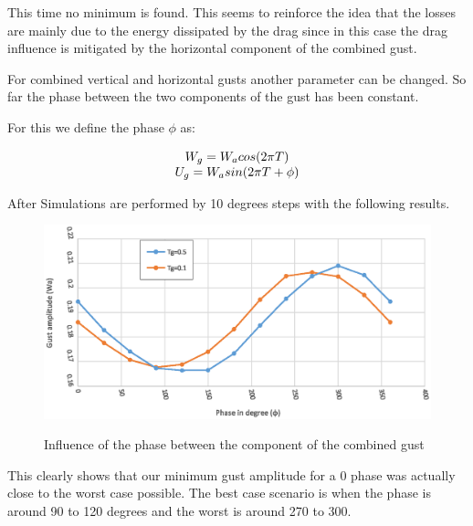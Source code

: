 \FloatBarrier

\par This time no minimum is found.
This seems to reinforce the idea that the losses are mainly due to the energy dissipated by the drag since in this case the drag influence is mitigated by the horizontal component of the combined gust.



\par For combined vertical and horizontal gusts another parameter can be changed.
So far the phase between the two components of the gust has been constant.

\par For this we define the phase $\phi$ as:

\begin{equation}
	\begin{array}[c]{c}
		W_g=W_a cos(2\pi T) \\
		U_g=W_a sin(2\pi T + \phi)
	\end{array}
	\label{eqn:combined_gust_phase}
\end{equation}

After Simulations are performed by 10 degrees steps with the following results.

\begin{figure}[ht]
	\begin{center}
		\scalebox{0.8}
		{\includegraphics{./Figures/combined_gust_amplitude_vs_phase.eps}}
	\end{center}
	\caption{Influence of the phase between the component of the combined gust}
	\label{fig:combined_amplitude_phase}
\end{figure}

\par This clearly shows that our minimum gust amplitude for a 0 phase was actually close to the worst case possible.
The best case scenario is when the phase is around 90 to 120 degrees and the worst is around 270 to 300.

